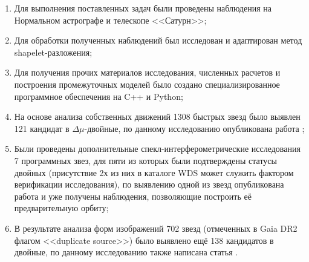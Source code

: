 \begin{enumerate}
 \item Для выполнения поставленных задач были проведены наблюдения на Нормальном астрографе и телескопе <<Сатурн>>;
 \item Для обработки полученных наблюдений был исследован и адаптирован метод shapelet-разложения;
   \item Для получения прочих материалов исследования, численных расчетов и построения промежуточных моделей было создано специализированное программное обеспечения на C++ и Python;
 \item На основе анализа собственных движений 1308 быстрых звезд было выявлен 121 кандидат в $\Delta\mu$-двойные, по данному исследованию опубликована работа \cite{2015AstL...41..833K};
 \item Были проведены дополнительные спекл-интерферометрические исследования 7 программных звез, для пяти из которых были подтверждены статусы двойных (присутствие 2х из них в каталоге WDS может служить фактором верификации исследования), по выявлению одной из звезд опубликована работа \cite{2016AstL...42..686K} и уже получены наблюдения, позволяющие построить её предварительную орбиту;
   \item В результате анализа форм изображений 702 звезд (отмеченных в Gaia DR2 флагом <<duplicate source>>) было выявлено ещё 138 кандидатов в двойные, по данному исследованию также написана статья \cite{2018AstL...44..103K}.
\end{enumerate}
